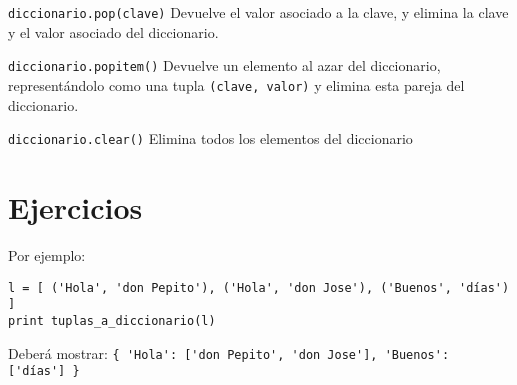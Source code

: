 \begin{referencia_python}
\begin{sintaxis}{\lstinline{diccionario.pop(clave)}}
Devuelve el valor asociado a la clave, y elimina la clave y el valor
asociado del diccionario.
\end{sintaxis}

\begin{sintaxis}{\lstinline{diccionario.popitem()}}
Devuelve un elemento al azar del diccionario, representándolo como una
tupla \lstinline{(clave, valor)} y elimina esta pareja del diccionario.
\end{sintaxis}

\begin{sintaxis}{\lstinline{diccionario.clear()}}
Elimina todos los elementos del diccionario
\end{sintaxis}

%
%

\end{referencia_python}


\newpage
\section{Ejercicios}


Por ejemplo: 
\begin{lstlisting}[numbers=none]
l = [ ('Hola', 'don Pepito'), ('Hola', 'don Jose'), ('Buenos', 'días') ]
print tuplas_a_diccionario(l)
\end{lstlisting}

Deberá mostrar: \lstinline!{ 'Hola': ['don Pepito', 'don Jose'], 'Buenos': ['días'] }!

